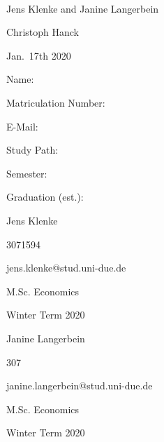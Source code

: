 \documentclass[12pt,a4paper]{article}
\begin{document}
\begin{titlepage}
\begin{center}
  \vspace{0.75cm}
  \large{}\\
  \vspace{0.5cm}
  Jens Klenke and Janine Langerbein\\
  \end{center}
  \vfill
  \hrulefill

  \noindent\begin{minipage}[t]{0.3\textwidth}
  \end{minipage}
  \begin{minipage}[t]{0.7\textwidth}
  \hspace{1cm}Christoph Hanck
  \end{minipage}

  \noindent\begin{minipage}[t]{0.3\textwidth}
  \end{minipage}
  \begin{minipage}[t]{0.7\textwidth}
  \hspace{1cm}Jan.~17th 2020
  \end{minipage}

  \hrulefill

  \begin{multicols}{3}
  
  \begin{scriptsize}
  
  Name:

  Matriculation Number:

  E-Mail:

  Study Path:

  Semester:

  Graduation (est.):
 
  \columnbreak

  Jens Klenke

  3071594
  
  jens.klenke@stud.uni-due.de

  M.Sc. Economics


  Winter Term 2020
  
  \columnbreak
  
  Janine Langerbein

  307
  
  janine.langerbein@stud.uni-due.de

  M.Sc. Economics


  Winter Term 2020
  
  \end{scriptsize}
  
  \end{multicols}
  
  

\end{titlepage}
\end{document}

